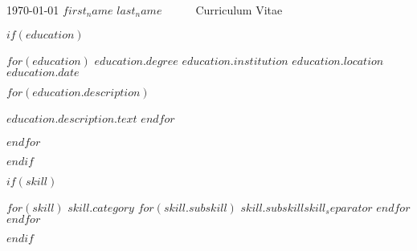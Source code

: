 \documentclass[11pt, a4paper]{awesome-cv}
\begin{document}
    \makecvheader

    \makecvfooter
    {\today}
    {$first_name$ $last_name$~~~\textperiodcentered~~~Curriculum Vitae}
    {\thepage}




    $if(education)$

    \begin{cventries}
        $for(education)$
        \cventry
        {$education.degree$} %
        {$education.institution$} %
        {$education.location$} %
        {$education.date$} %
        {
        \begin{cvitems}
            $for(education.description)$
            \item {$education.description.text$}
            $endfor$
        \end{cvitems}
        }
        $endfor$
    \end{cventries}
    $endif$


    $if(skill)$

    \begin{cvskills}
        $for(skill)$
        \cvskill
        {$skill.category$}
        {
        $for(skill.subskill)$
        $skill.subskill$$skill_separator$
        $endfor$
        }
        $endfor$
    \end{cvskills}
    $endif$

\end{document}
